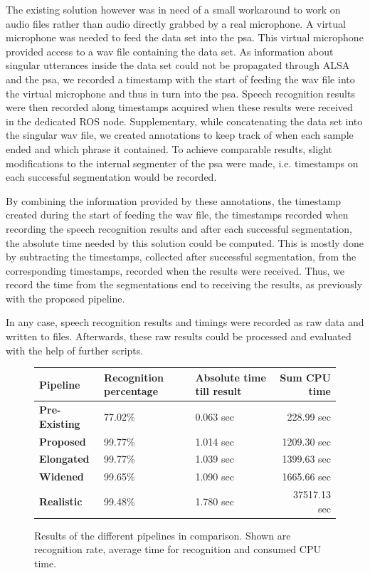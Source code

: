 The existing solution however was in need of a small workaround to work on audio files rather than audio directly grabbed by a real microphone.
A virtual microphone was needed to feed the data set into the \gls{psa}.
This virtual microphone provided access to a wav file containing the data set. 
As information about singular utterances inside the data set could not be propagated through ALSA and the \gls{psa}, we recorded a timestamp with the start of feeding the wav file into the virtual microphone and thus in turn into the \gls{psa}.
Speech recognition results were then recorded along timestamps acquired when these results were received in the dedicated ROS node.
Supplementary, while concatenating the data set into the singular wav file, we created annotations to keep track of when each sample ended and which phrase it contained.
To achieve comparable results, slight modifications to the internal segmenter of the \gls{psa} were made, i.e. timestamps on each successful segmentation would be recorded.

By combining the information provided by these annotations, the timestamp created during the start of feeding the wav file, the timestamps recorded when recording the speech recognition results and after each successful segmentation, the absolute time needed by this solution could be computed. 
This is mostly done by subtracting the timestamps, collected after successful segmentation, from the corresponding timestamps, recorded when the results were received.
Thus, we record the time from the segmentations end to receiving the results, as previously with the proposed pipeline.

In any case, speech recognition results and timings were recorded as raw data and written to files.
Afterwards, these raw results could be processed and evaluated with the help of further scripts.

\begin{figure}[]
	\centering
	\begin{tabular}{ | l | p{} | p{} | r|}
		\hline
		\textbf{Pipeline} 	& \textbf{Recognition percentage} & \textbf{Absolute time till result} & \textbf{Sum CPU time} \\ \hline
		\textbf{Pre-Existing} 	& 77.02\% & 0.063 sec &   228.99 sec \\ \hline
		\textbf{Proposed} 	& 99.77\% & 1.014 sec &  1209.30 sec \\ \hline
		\textbf{Elongated} 	& 99.77\% & 1.039 sec &  1399.63 sec \\ \hline
		\textbf{Widened} 	& 99.65\% & 1.090 sec &  1665.66 sec \\ \hline
		\textbf{Realistic} 	& 99.48\% & 1.780 sec & 37517.13 sec \\ \hline
	\end{tabular}
	\caption{Results of the different pipelines in comparison.
		Shown are recognition rate, average time for recognition and consumed CPU time.}
	\label{table:eval_dataset_results}
\end{figure}

